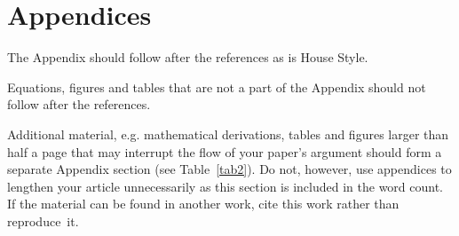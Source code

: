 \documentclass{cta-author}
\begin{document}
\vfill\pagebreak

\section{Appendices}\label{sec14}

The Appendix should follow after the references as is House Style.

Equations, figures and tables that are not a part of the Appendix should not follow after the references.

Additional material, e.g. mathematical derivations, tables and figures
larger than half a page that may interrupt the flow of your paper's argument
should form a separate Appendix section (see Table~\ref{tab2}). Do not, however, use
appendices to lengthen your article unnecessarily as this section is
included in the word count. If the material can be found in another work,
cite this work rather than reproduce~it.
\end{document}
